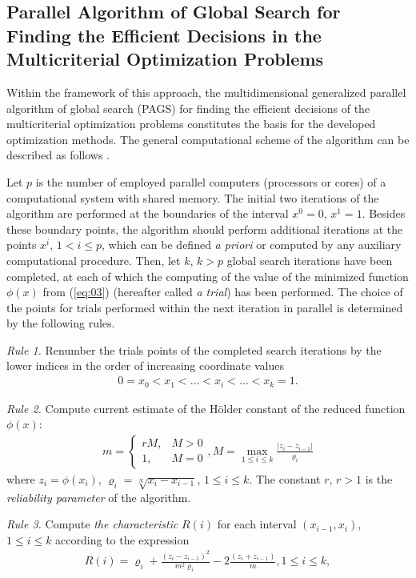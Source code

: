 \documentclass[runningheads]{llncs}
\begin{document}
\subsection{Parallel Algorithm of Global Search for Finding the Efficient Decisions in the Multicriterial Optimization Problems}

Within the framework of this approach, the multidimensional generalized parallel algorithm of global search (PAGS) for finding the efficient decisions of the multicriterial optimization problems constitutes the basis for the developed optimization methods. The general computational scheme of the algorithm can be described as follows \cite{c11,c12,c13}.

Let $p$ is the number of employed parallel computers (processors or cores) of a computational system with shared memory. The initial two iterations of the algorithm are performed at the boundaries of the interval $x^0=0$, $x^1=1$. Besides these boundary points, the algorithm should perform additional iterations at the points $x^i$, $1<i \leq p$, which can be defined \textit{a priori} or computed by any auxiliary computational procedure. Then, let $k$, $k>p$ global search iterations have been completed, at each of which the computing of the value of the minimized function $\phi(x)$ from (\ref{eq:03}) (hereafter called \textit{a trial}) has been performed. The choice of the points for trials performed within the next iteration in parallel is determined by the following rules.

\textit{Rule 1.} Renumber the trials points of the completed search iterations by the lower indices in the order of increasing coordinate values
\begin{eqnarray} \label{eq:05}
	0=x_0<x_1<\dots<x_i<\dots<x_k=1.
\end{eqnarray}

\textit{Rule 2.} Compute current estimate of the H\"{o}lder constant of the reduced function $\phi(x)$:
\begin{eqnarray} \label{eq:06}
	m = 
 \begin{cases}
   r M, & M > 0 \\
   1,   & M = 0
 \end{cases} ,
 M = \max_{1 \leq i \leq k} {\frac{|z_i - z_{i-1}|} {\varrho_i} }
\end{eqnarray}
where $z_i=\phi(x_i )$, $\varrho_i=\sqrt[N]{x_i-x_{i-1}}$, $1 \leq i \leq k$. The constant $r$, $r>1$ is the \textit{reliability parameter} of the algorithm.

\textit{Rule 3.} Compute \textit{the characteristic} $R(i)$ for each interval $(x_{i-1}  ,x_i)$, $1 \leq i \leq k$ according to the expression 
\begin{eqnarray} \label{eq:07}
R(i) = \varrho_i + \frac{(z_i - z_{i-1})^2}{m^2 \varrho_i} - 2 \frac{(z_i + z_{i-1})}{m}, 1 \leq i \leq k,
\end{eqnarray}
\end{document}
